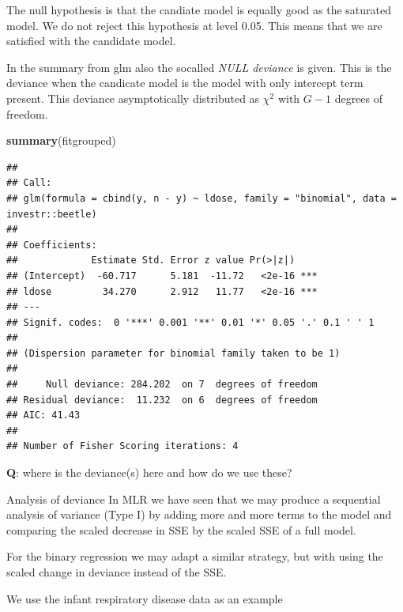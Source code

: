 \documentclass[
  ignorenonframetext,
]{beamer}
\newenvironment{Shaded}{\begin{snugshade}}{\end{snugshade}}
\newcommand{\FunctionTok}[1]{\textcolor[rgb]{0.13,0.29,0.53}{\textbf{#1}}}
\newcommand{\NormalTok}[1]{#1}
\begin{document}
\begin{frame}
The null hypothesis is that the candiate model is equally good as the
saturated model. We do not reject this hypothesis at level 0.05. This
means that we are satisfied with the candidate model.

In the summary from glm also the socalled \emph{NULL deviance} is given.
This is the deviance when the candicate model is the model with only
intercept term present. This deviance asymptotically distributed as
\(\chi^2\) with \(G-1\) degrees of freedom.
\end{frame}

\begin{frame}[fragile]
\footnotesize

\begin{Shaded}
\begin{Highlighting}[]
\FunctionTok{summary}\NormalTok{(fitgrouped)}
\end{Highlighting}
\end{Shaded}

\begin{verbatim}
## 
## Call:
## glm(formula = cbind(y, n - y) ~ ldose, family = "binomial", data = investr::beetle)
## 
## Coefficients:
##             Estimate Std. Error z value Pr(>|z|)    
## (Intercept)  -60.717      5.181  -11.72   <2e-16 ***
## ldose         34.270      2.912   11.77   <2e-16 ***
## ---
## Signif. codes:  0 '***' 0.001 '**' 0.01 '*' 0.05 '.' 0.1 ' ' 1
## 
## (Dispersion parameter for binomial family taken to be 1)
## 
##     Null deviance: 284.202  on 7  degrees of freedom
## Residual deviance:  11.232  on 6  degrees of freedom
## AIC: 41.43
## 
## Number of Fisher Scoring iterations: 4
\end{verbatim}

\normalsize

\textbf{Q}: where is the deviance(s) here and how do we use these?
\end{frame}

\begin{frame}
\begin{block}{Analysis of deviance}
\label{analysis-of-deviance}
In MLR we have seen that we may produce a sequential analysis of
variance (Type I) by adding more and more terms to the model and
comparing the scaled decrease in SSE by the scaled SSE of a full model.

For the binary regression we may adapt a similar strategy, but with
using the scaled change in deviance instead of the SSE.

We use the infant respiratory disease data as an example
\end{block}
\end{frame}
\end{document}

